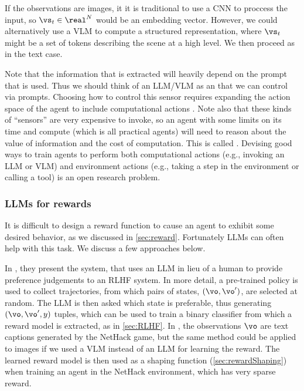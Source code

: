 If the observations are images,
it it is traditional to use a CNN to proccess the input,
so $\vs_t \in \real^N$ would be an embedding vector.
However, we could alternatively use a VLM
to compute a structured representation,
where $\vs_t$ might be a set of tokens
describing  the scene at a high level.
We then proceed as in the text case.

Note that the information that is extracted will heavily depend on the prompt
that is used.
Thus we should think of an LLM/VLM as an 
that we can control via prompts.
Choosing how to control this sensor
requires expanding the action space of the agent
to include computational actions \citep{Chen2024vlm}.
Note also that these kinds of ``sensors'' are very expensive to invoke,
so an agent with some limits on its time and compute (which is all practical agents)
will need to  reason about the value of information
and the cost of computation.
This is called  \citep{Russell1991}.
Devising good ways to train agents to perform both computational actions (e.g., invoking
an LLM or VLM) and environment actions (e.g., taking a step in the environment
or calling a tool) is an open research problem.


\subsubsection{LLMs for rewards}
\label{sec:LLMreward}

It is difficult to design a reward function to cause an agent
to exhibit some desired behavior, as we discussed in \cref{sec:reward}.
Fortunately LLMs can often help with this task. We discuss a few
approaches below.

In \citep{Klissarov2024}, they present the  system,
that uses
an LLM in lieu of a human to provide preference judgements to an RLHF system.
In more detail, a pre-trained policy is used to collect trajectories,
from which pairs of states, $(\vo, \vo')$, are selected at random.
The LLM is then asked which state is preferable, thus generating
$(\vo, \vo', y)$ tuples, which can be used to train a binary classifier
from which a reward model is extracted,
as in \cref{sec:RLHF}.
In \citep{Klissarov2024}, the observations $\vo$ 
are text captions generated by the NetHack game,
but the same method could be applied to images if we
used a VLM instead of an LLM for learning the reward.
The learned reward model is then used as a shaping function
(\cref{sec:rewardShaping}) when training an agent
in the NetHack environment,
which has very sparse reward.



